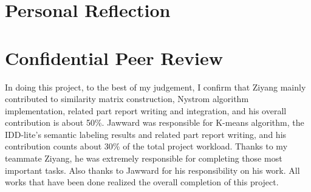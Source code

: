 \documentclass[final]{cvpr}
\begin{document}
\section*{Personal Reflection}

\section*{Confidential Peer Review}

In doing this project, to the best of my judgement, I confirm that Ziyang mainly contributed to similarity matrix construction, Nystrom algorithm implementation, related part report writing and integration, and his overall contribution is about 50\%. Jawward was responsible for K-means algorithm, the IDD-lite’s semantic labeling results and related part report writing, and his contribution counts about 30\% of the total project workload. Thanks to my teammate Ziyang, he was extremely responsible for completing those most important tasks. Also thanks to Jawward for his responsibility on his work. All works that have been done realized the overall completion of this project.
\end{document}
